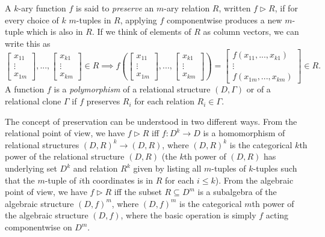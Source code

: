 \documentclass[letterpaper,11pt]{article}
\begin{document}
\begin{defn} A $k$-ary function $f$ is said to \emph{preserve} an $m$-ary relation $R$, written $f \rhd R$, if for every choice of $k$ $m$-tuples in $R$, applying $f$ componentwise produces a new $m$-tuple which is also in $R$. If we think of elements of $R$ as column vectors, we can write this as
\[
\begin{bmatrix} x_{11}\\ \vdots\\ x_{1m} \end{bmatrix}, ..., \begin{bmatrix} x_{k1}\\ \vdots\\ x_{km} \end{bmatrix} \in R \implies f\left( \begin{bmatrix} x_{11}\\ \vdots\\ x_{1m} \end{bmatrix}, ..., \begin{bmatrix} x_{k1}\\ \vdots\\ x_{km} \end{bmatrix}\right) = \begin{bmatrix} f(x_{11}, ..., x_{k1})\\ \vdots\\ f(x_{1m}, ..., x_{km}) \end{bmatrix} \in R.
\]
A function $f$ is a \emph{polymorphism} of a relational structure $(D, \Gamma)$ or of a relational clone $\Gamma$ if $f$ preserves $R_i$ for each relation $R_i \in \Gamma$.
\end{defn}

The concept of preservation can be understood in two different ways. From the relational point of view, we have $f \rhd R$ iff $f : D^k \rightarrow D$ is a homomorphism of relational structures $(D,R)^k \rightarrow (D,R)$, where $(D,R)^k$ is the categorical $k$th power of the relational structure $(D,R)$ (the $k$th power of $(D,R)$ has underlying set $D^k$ and relation $R^k$ given by listing all $m$-tuples of $k$-tuples such that the $m$-tuple of $i$th coordinates is in $R$ for each $i \le k$). From the algebraic point of view, we have $f \rhd R$ iff the subset $R \subseteq D^m$ is a subalgebra of the algebraic structure $(D,f)^m$, where $(D,f)^m$ is the categorical $m$th power of the algebraic structure $(D,f)$, where the basic operation is simply $f$ acting componentwise on $D^m$.
\end{document}
